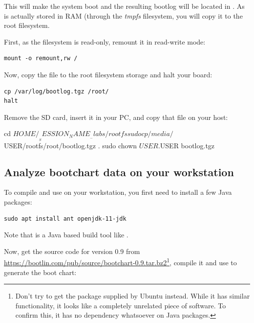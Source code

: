 This will make the system boot and the resulting bootlog will be located
in . As  is actually stored in
RAM (through the {\em tmpfs} filesystem, you will copy it to the root
filesystem.

First, as the filesystem is read-only, remount it in read-write mode:
\begin{verbatim}
mount -o remount,rw /
\end{verbatim}

Now, copy the file to the root filesystem storage and halt your board:

\begin{verbatim}
cp /var/log/bootlog.tgz /root/
halt
\end{verbatim}

Remove the SD card, insert it in your PC, and copy that file on your host:

\begin{bashinput}
cd $HOME/__SESSION_NAME__-labs/rootfs
sudo cp /media/$USER/rootfs/root/bootlog.tgz .
sudo chown $USER.$USER bootlog.tgz
\end{bashinput}

\subsection{Analyze bootchart data on your workstation}

To compile and use  on your workstation, you first need to
install a few Java packages:

\begin{verbatim}
sudo apt install ant openjdk-11-jdk
\end{verbatim}

Note that  is a Java based build tool like .

Now, get the  source code for version 0.9 from
\url{https://bootlin.com/pub/source/bootchart-0.9.tar.bz2}\footnote{Don't try to get the  package supplied by
Ubuntu instead. While it has similar functionality, it looks like a completely
unrelated piece of software. To confirm this, it has no dependency
whatsoever on Java packages.}, compile it and use  to generate the boot
chart:


